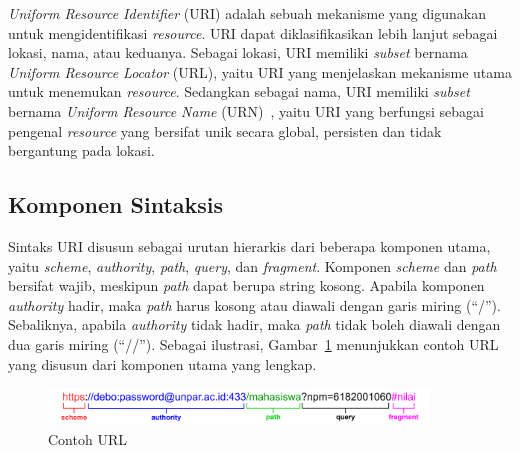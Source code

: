 





\textit{Uniform Resource Identifier} (URI) adalah sebuah mekanisme yang digunakan untuk mengidentifikasi \textit{resource}. URI dapat diklasifikasikan lebih lanjut sebagai lokasi, nama, atau keduanya. Sebagai lokasi, URI memiliki \textit{subset} bernama \textit{Uniform Resource Locator} (URL),  yaitu URI yang menjelaskan mekanisme utama untuk menemukan \textit{resource}. Sedangkan sebagai nama, URI memiliki \textit{subset} bernama \textit{Uniform Resource Name} (URN)~\cite{RFC2141}, yaitu URI yang berfungsi sebagai pengenal \textit{resource} yang bersifat unik secara global, persisten dan tidak bergantung pada lokasi.


\subsection{Komponen Sintaksis}
\label{subsec:0202-komponen-sintaksis}
Sintaks URI disusun sebagai urutan hierarkis dari beberapa komponen utama, yaitu \textit{scheme}, \textit{authority}, \textit{path}, \textit{query}, dan \textit{fragment}. Komponen \textit{scheme} dan \textit{path} bersifat wajib, meskipun \textit{path} dapat berupa string kosong. Apabila komponen \textit{authority} hadir, maka \textit{path} harus kosong atau diawali dengan garis miring (``/''). Sebaliknya, apabila \textit{authority} tidak hadir, maka \textit{path} tidak boleh diawali dengan dua garis miring (``//''). Sebagai ilustrasi, Gambar~\ref{fig:contoh-url} menunjukkan contoh URL yang disusun dari komponen utama yang lengkap.

\begin{figure}[H]
    \centering
    \includegraphics[width=0.90\textwidth]{Gambar/020201-contoh-url.png}
    \caption{Contoh URL}
    \label{fig:contoh-url}
\end{figure}


